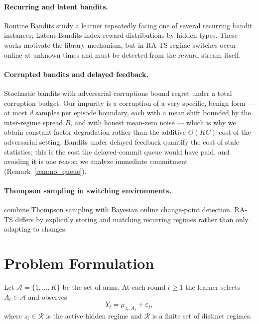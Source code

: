 \documentclass[11pt]{article}
\newcommand{\Acal}{\mathcal A}
\newcommand{\Rcal}{\mathcal R}
\begin{document}
\paragraph{Recurring and latent bandits.}
Routine Bandits \citep{SaberEtAl2021} study a learner repeatedly facing one of several recurring bandit instances; Latent Bandits \citep{MaillardMannor2014} index reward distributions by hidden types. These works motivate the library mechanism, but in RA-TS regime switches occur online at unknown times and must be detected from the reward stream itself.

\paragraph{Corrupted bandits and delayed feedback.}
Stochastic bandits with adversarial corruptions \citep{LykourisMirrokniPaesLeme2018,GuptaKorenTalwar2019} bound regret under a total corruption budget. Our impurity is a corruption of a very specific, benign form --- at most $d$ samples per episode boundary, each with a mean shift bounded by the inter-regime spread $B$, and with honest mean-zero noise --- which is why we obtain constant-factor degradation rather than the additive $\Theta(KC)$ cost of the adversarial setting. Bandits under delayed feedback \citep{JoulaniGyorgySzepesvari2013} quantify the cost of stale statistics; this is the cost the delayed-commit queue would have paid, and avoiding it is one reason we analyze immediate commitment (Remark~\ref{rem:no_queue}).

\paragraph{Thompson sampling in switching environments.}
\citet{MellorShapiro2013} combine Thompson sampling with Bayesian online change-point detection. RA-TS differs by explicitly storing and matching recurring regimes rather than only adapting to changes.

\section{Problem Formulation}
\label{sec:model}

Let $\Acal=\{1,\ldots,K\}$ be the set of arms. At each round $t\ge 1$ the learner selects $A_t\in\Acal$ and observes
\begin{equation}
    Y_t=\mu_{z_t,A_t}+\varepsilon_t,
    \label{eq:reward_model}
\end{equation}
where $z_t\in\Rcal$ is the active hidden regime and $\Rcal$ is a finite set of distinct regimes.
\end{document}
